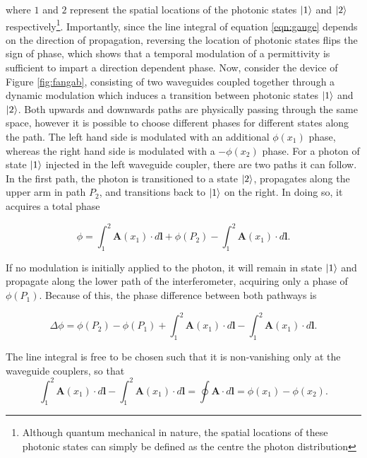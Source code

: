 where $1$ and $2$ represent the spatial locations of the photonic states $\ket{1}$ and $\ket{2}$ respectively\footnote[1]{Although quantum mechanical in nature, the spatial locations of these photonic states can simply be defined as the centre the photon distribution}. Importantly, since the line integral of equation \ref{eqn:gauge} depends on the direction of propagation, reversing the location of photonic states flips the sign of phase, which shows that a temporal modulation of a permittivity is sufficient to impart a direction dependent phase. \label{sec:gauge} Now, consider the device of Figure \ref{fig:fangab}, consisting of two waveguides coupled together through a dynamic modulation which induces a transition between photonic states $\ket{1}$ and $\ket{2}$. Both upwards and downwards paths are physically passing through the same space, however it is possible to choose different phases for different states along the path. The left hand side is modulated with an additional $\phi(x_1)$ phase, whereas the right hand side is modulated with a $-\phi(x_2)$ phase. For a photon of state $\ket{1}$ injected in the left waveguide coupler, there are two paths it can follow. In the first path, the photon is transitioned to a state $\ket{2}$, propagates along the upper arm in path $P_2$, and transitions back to $\ket{1}$ on the right. In doing so, it acquires a total phase

\begin{equation}
\phi = \int_1^2 \bm{A}(x_1) \cdot d\bm{l} + \phi(P_2) -\int_1^2 \bm{A}(x_1) \cdot d\bm{l}.
\end{equation}

If no modulation is initially applied to the photon, it will remain in state $\ket{1}$ and propagate along the lower path of the interferometer, acquiring only a phase of $\phi(P_1)$. Because of this, the phase difference between both pathways is 

\begin{equation}
\Delta \phi =  \phi(P_2) - \phi(P_1) + \int_1^2 \bm{A}(x_1) \cdot d\bm{l} -\int_1^2 \bm{A}(x_1) \cdot d\bm{l}.
\end{equation}

The line integral is free to be chosen such that it is non-vanishing only at the waveguide couplers, so that
\begin{equation}
 \int_1^2 \bm{A}(x_1) \cdot d\bm{l} -\int_1^2 \bm{A}(x_1) \cdot d\bm{l} = \oint \bm{A} \cdot d\bm{l} = \phi(x_1) - \phi(x_2).
\end{equation}


